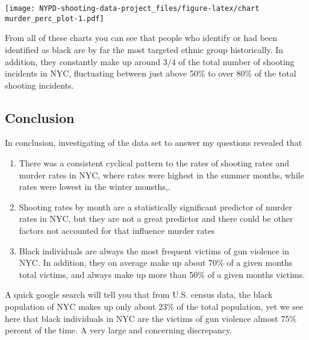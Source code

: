 \documentclass[
]{article}
\begin{document}
\texttt{[image: NYPD-shooting-data-project\_files/figure-latex/chart murder\_perc\_plot-1.pdf]}

From all of these charts you can see that people who identify or had
been identified as black are by far the most targeted ethnic group
historically. In addition, they constantly make up around 3/4 of the
total number of shooting incidents in NYC, fluctuating between just
above 50\% to over 80\% of the total shooting incidents.

\hypertarget{conclusion}{%
\subsection{Conclusion}\label{conclusion}}

In conclusion, investigating of the data set to answer my questions
revealed that

\begin{enumerate}
\def\labelenumi{\arabic{enumi}.}
\item
  There was a consistent cyclical pattern to the rates of shooting rates
  and murder rates in NYC, where rates were highest in the summer
  months, while rates were lowest in the winter monsths,.
\item
  Shooting rates by month are a statistically significant predictor of
  murder rates in NYC, but they are not a great predictor and there
  could be other factors not accounted for that influence murder rates
\item
  Black individuals are always the most frequent victims of gun violence
  in NYC. In addition, they on average make up about 70\% of a given
  months total victims, and always make up more than 50\% of a given
  months victims.
\end{enumerate}

A quick google search will tell you that from U.S. census data, the
black population of NYC makes up only about 23\% of the total
population, yet we see here that black individuals in NYC are the
victims of gun violence almost 75\% percent of the time. A very large
and concerning discrepancy.
\end{document}
